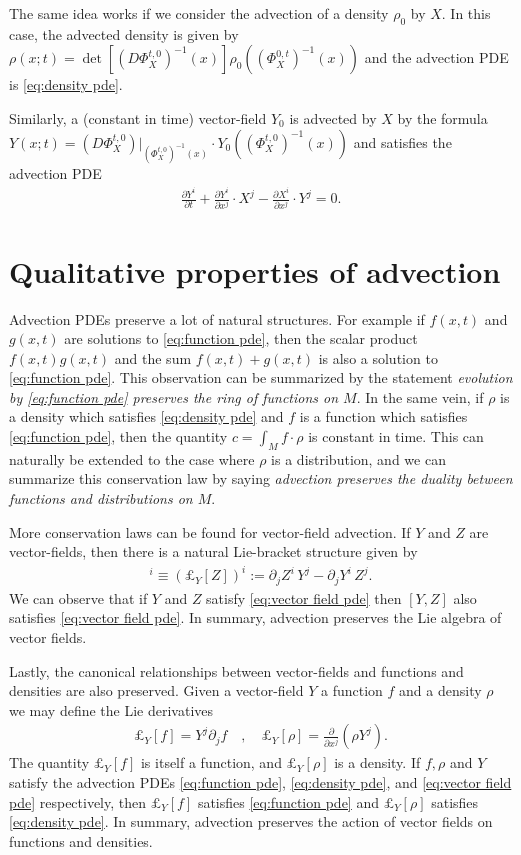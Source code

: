 \documentclass[12pt]{amsart}
\newcommand{\pder}[2]{\ensuremath{\frac{ \partial #1}{\partial #2}}}
\begin{document}
The same idea works if we consider the advection of a density $\rho_{0}$ by $X$.
In this case, the advected density is given by $\rho (x ; t) =  \det\left[ (D\Phi_{X}^{t,0})^{-1} (x) \right] \rho_{0}( (\Phi_{X}^{0,t})^{-1}(x) )$
and the advection PDE is \ref{eq:density pde}.

Similarly, a (constant in time) vector-field $Y_{0}$ is advected by $X$ by the formula $Y(x ; t) =  (D\Phi_{X}^{t,0})|_{(\Phi_{X}^{t,0})^{-1}(x)} \cdot Y_{0}( (\Phi_{X}^{t,0})^{-1}(x))$
and satisfies the advection PDE
\begin{align} \label{eq:vector field pde}
	\pder{Y^{i}}{t} + \pder{Y^{i}}{x^{j}} \cdot X^{j} - \pder{X^{i}}{x^{j}} \cdot Y^{j} = 0.
\end{align}

\section{Qualitative properties of advection}
\label{sec:properties}
Advection PDEs preserve a lot of natural structures.
For example if $f(x,t)$ and $g(x,t)$ are solutions to \eqref{eq:function pde}, then the scalar product $f(x,t) g(x,t)$  and the sum $f(x,t) + g(x,t)$ is also a solution to \eqref{eq:function pde}.
This observation can be summarized by the statement \emph{evolution by \eqref{eq:function pde} preserves the ring of functions on $M$}.
In the same vein, if $\rho$ is a density which satisfies \eqref{eq:density pde} and $f$ is a function which satisfies \eqref{eq:function pde}, then the quantity $c = \int_{M} f \cdot \rho$ is constant in time.
This can naturally be extended to the case where $\rho$ is a distribution, and we can summarize this conservation law by saying \emph{advection preserves the duality between functions and distributions on $M$}.

More conservation laws can be found for vector-field advection.
If $Y$ and $Z$ are vector-fields, then there is a natural Lie-bracket structure given by
\begin{align}
	[Y,Z]^{i} \equiv ( \pounds_{Y}[Z] )^{i} := \partial_{j}Z^{i} \, Y^{j} - \partial_{j}Y^{i} \, Z^{j}.
\end{align}
We can observe that if $Y$ and $Z$ satisfy \eqref{eq:vector field pde} then $[Y,Z]$ also satisfies \eqref{eq:vector field pde}.
In summary, advection preserves the Lie algebra of vector fields.

Lastly, the canonical relationships between vector-fields and functions and densities are also preserved.
Given a vector-field $Y$ a function $f$ and a density $\rho$ we may define the Lie derivatives
\begin{align}
	\pounds_{Y}[f] = Y^{j} \partial_{j}f \quad , \quad \pounds_{Y}[\rho] = \pder{}{x^{j}} ( \rho Y^{j} ).
\end{align}
The quantity $\pounds_{Y}[f]$ is itself a function, and $\pounds_{Y}[\rho]$ is a density.
If $f,\rho$ and $Y$ satisfy the advection PDEs \eqref{eq:function pde}, \eqref{eq:density pde}, and \eqref{eq:vector field pde} respectively,
then $\pounds_{Y}[f]$ satisfies \eqref{eq:function pde} and $\pounds_{Y}[\rho]$ satisfies \eqref{eq:density pde}.
In summary, advection preserves the action of vector fields on functions and densities.
\end{document}
